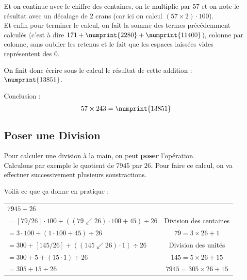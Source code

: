 \documentclass[a4paper]{article}
\begin{document}
Et on continue avec le chiffre des centaines, on le multiplie par 57 et on note le résultat avec un décalage de 2 crans (car ici on calcul $(57 \times 2) \cdot 100$).\\

Et enfin pour terminer le calcul, on fait la somme des termes précédemment calculés (c'est à dire $ 171 + \numprint{2280} + \numprint{11400} $), colonne par colonne, sans oublier les retenus et le fait que les espaces laissées vides représentent des 0.

On finit donc écrire sous le calcul le résultat de cette addition : $\numprint{13851}$.\\

\vfill

Conclusion :
{\large $$ 57 \times 243 = \numprint{13851}$$}

\vfill

\pagebreak






\subsection{Poser une Division}

Pour calculer une division à la main, on peut \textbf{poser} l'opération.\\

Calculons par exemple le quotient de $7945$ par $26$. Pour faire ce calcul, on va effectuer successivement plusieurs soustractions.

Voilà ce que ça donne en pratique :

\doublespacing

	\begin{tabular}{l|c}

	$ 7945 \div 26$

	\tabularnewline

	$= [79/26] \cdot 100 + ( (79\swarrow26) \cdot 100 + 45 ) \div 26$ & Division des centaines

	\tabularnewline

	$= 3 \cdot 100 + ( 1 \cdot 100 + 45 ) \div 26$ & $79 = 3\times26+1$

	\tabularnewline

	$= 300 + [145/26] + ( (145\swarrow26) \cdot 1 ) \div 26$ & Division des unités

	\tabularnewline

	$= 300 + 5 + ( 15 \cdot 1 ) \div 26$ & $145 = 5\times26+15$

	\tabularnewline

	$= 305 + 15 \div 26 $ & \boldmath $7945 = 305 \times 26 + 15$

	\tabularnewline

	\end{tabular}
\end{document}
